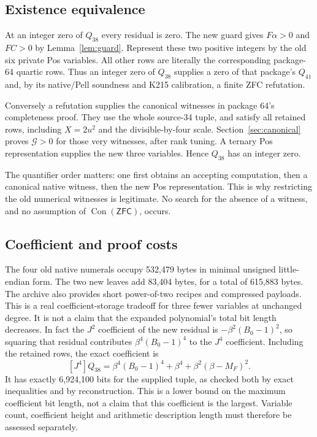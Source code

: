 \documentclass[11pt]{article}
\theoremstyle{definition}\newtheorem{definition}[theorem]{Definition}
\theoremstyle{remark}\newtheorem{remark}[theorem]{Remark}
\newcommand{\Con}{\operatorname{Con}}
\newcommand{\ZFC}{\mathsf{ZFC}}
\newcommand{\PhiG}{\mathcal G}
\begin{document}
\subsection{Existence equivalence}

At an integer zero of $Q_{38}$ every residual is zero. The new guard gives
$F\alpha>0$ and $FC>0$ by Lemma~\ref{lem:guard}. Represent these two
positive integers by the old six private Pos variables. All other rows
are literally the corresponding package-64 quartic rows. Thus an integer
zero of $Q_{38}$ supplies a zero of that package's $Q_{41}$ and, by its
native/Pell soundness and K215 calibration, a finite ZFC refutation.

Conversely a refutation supplies the canonical witnesses in package 64's
completeness proof. They use the whole source-34 tuple, and satisfy all
retained rows, including $X=2u^2$ and the divisible-by-four scale.
Section~\ref{sec:canonical} proves $\PhiG>0$ for those very witnesses,
after rank tuning. A ternary Pos representation supplies the new three
variables. Hence $Q_{38}$ has an integer zero.

The quantifier order matters: one first obtains an accepting computation,
then a canonical native witness, then the new Pos representation. This
is why restricting the old numerical witnesses is legitimate. No search
for the absence of a witness, and no assumption of $\Con(\ZFC)$, occurs.

\subsection{Coefficient and proof costs}

The four old native numerals occupy 532,479 bytes in minimal unsigned
little-endian form. The two new leaves add 83,404 bytes, for a total of
615,883 bytes. The archive also provides short power-of-two recipes
and compressed payloads. This is a real coefficient-storage tradeoff for
three fewer variables at unchanged degree. It is not a claim that the
expanded polynomial's total bit length decreases. In fact the $J^2$
coefficient of the new residual is $-\beta^2(B_0-1)^2$, so squaring
that residual contributes $\beta^4(B_0-1)^4$ to the $J^4$ coefficient.
Including the retained rows, the exact coefficient is
\[
 [J^4]Q_{38}=\beta^4(B_0-1)^4+\beta^4+\beta^2(\beta-M_F)^2.
\]
It has exactly 6,924,100 bits for the supplied tuple, as checked both by
exact inequalities and by reconstruction. This is a lower bound on the
maximum coefficient bit length, not a claim that this coefficient is the
largest. Variable count, coefficient height and arithmetic description
length must therefore be assessed separately.
\end{document}
